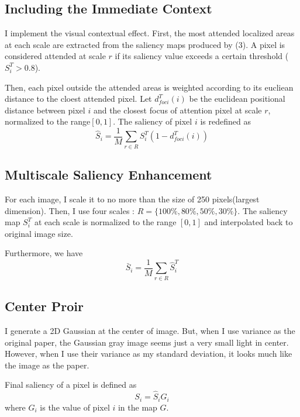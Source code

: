 \documentclass[10pt,twocolumn,letterpaper]{article}
\begin{document}
\subsection{Including the Immediate Context}
I implement the visual contextual effect. First, the most attended localized areas at each scale are extracted from the saliency maps produced by (3). A pixel is
considered attended at scale $r$ if its saliency value exceeds a certain threshold ($S_{i}^{T}>0.8$).
\par Then, each pixel outside the attended areas is weighted according to its eucliean distance to the cloest attended pixel. Let $d_{foci}^{T}(i)$ be the euclidean positional distance between pixel $i$ and the closest focus of attention pixel at scale $r$, normalized to the range$[0,1]$. The saliency of pixel $i$ is redefined as
\begin{equation}
\hat S_i = \frac{1}{M}\sum_{r\in R} S_{i}^{T}(1-d_{foci}^{T}(i))
\end{equation}

\subsection{Multiscale Saliency Enhancement}
For each image, I scale it to no more than the size of 250 pixels(largest dimension). Then, I use four scales : $R = \{100\%, 80\%, 50\%, 30\%\}$.
The saliency map $S_{i}^{T}$ at each scale is normalized to the range $[0,1]$ and interpolated back to original image size.
\par Furthermore, we have
\begin{equation}
\bar S_{i} = \frac{1}{M}\sum_{r\in R}\hat S_{i}^{T}
\end{equation}

\subsection{Center Proir}
I generate a 2D Gaussian at the center of image. But, when I use variance as the original paper, the Gaussian gray image seems just a very small light in center. However, when I use their variance as my standard deviation, it looks much like the image as the paper.
\par Final saliency of a pixel is defined as 
\begin{equation}
S_i = \hat S_i G_i
\end{equation}
where $G_i$ is the value of pixel $i$ in the map $G$.
\end{document}
